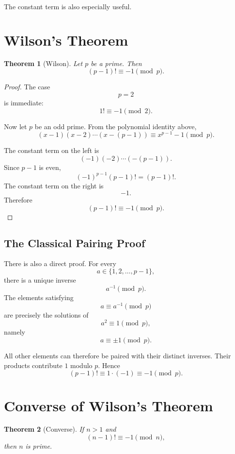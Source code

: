 \documentclass[11pt]{article}
\newtheorem{theorem}{Theorem}[section]
\theoremstyle{remark}
\begin{document}
The constant term is also especially useful.

\section{Wilson's Theorem}

\begin{theorem}[Wilson]
Let $p$ be a prime. Then
\[
    \boxed{
    (p-1)!\equiv-1\pmod p.
    }
\]
\end{theorem}

\begin{proof}
The case
\[
    p=2
\]
is immediate:
\[
    1!\equiv-1\pmod2.
\]

Now let $p$ be an odd prime. From the polynomial identity above,
\[
    (x-1)(x-2)\cdots(x-(p-1))
    \equiv
    x^{p-1}-1
    \pmod p.
\]

The constant term on the left is
\[
    (-1)(-2)\cdots(-(p-1)).
\]
Since $p-1$ is even,
\[
    (-1)^{p-1}(p-1)!
    =
    (p-1)!.
\]
The constant term on the right is
\[
    -1.
\]
Therefore
\[
    (p-1)!\equiv-1\pmod p.
\]
\end{proof}

\subsection{The Classical Pairing Proof}

There is also a direct proof. For every
\[
    a\in\{1,2,\ldots,p-1\},
\]
there is a unique inverse
\[
    a^{-1}\pmod p.
\]
The elements satisfying
\[
    a\equiv a^{-1}\pmod p
\]
are precisely the solutions of
\[
    a^2\equiv1\pmod p,
\]
namely
\[
    a\equiv\pm1\pmod p.
\]

All other elements can therefore be paired with their distinct inverses.
Their products contribute $1$ modulo $p$. Hence
\[
    (p-1)!
    \equiv
    1\cdot(-1)
    \equiv-1
    \pmod p.
\]

\section{Converse of Wilson's Theorem}

\begin{theorem}[Converse]
If $n>1$ and
\[
    \boxed{
    (n-1)!\equiv-1\pmod n,
    }
\]
then $n$ is prime.
\end{theorem}
\end{document}
